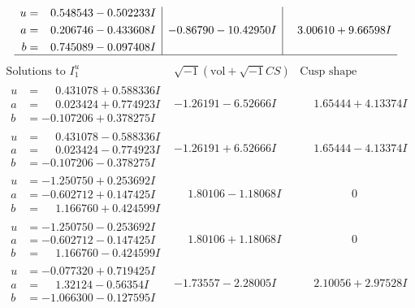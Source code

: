 \documentclass[1p]{elsarticle_modified}
\theoremstyle{definition}
\newcommand{\I}{\sqrt{-1}}
\begin{document}
$$\begin{array}{c|c|c}
\begin{aligned}
u &= \phantom{-}0.548543 - 0.502233 I \\
a &= \phantom{-}0.206746 - 0.433608 I \\
b &= \phantom{-}0.745089 - 0.097408 I\end{aligned}
 & -0.86790 - 10.42950 I & \phantom{-}3.00610 + 9.66598 I\\
 \hline 
 \end{array}$$\newpage$$\begin{array}{c|c|c}  
\text{Solutions to }I^u_{1}& \I (\text{vol} + \sqrt{-1}CS) & \text{Cusp shape}\\
 \hline 
\begin{aligned}
u &= \phantom{-}0.431078 + 0.588336 I \\
a &= \phantom{-}0.023424 + 0.774923 I \\
b &= -0.107206 + 0.378275 I\end{aligned}
 & -1.26191 - 6.52666 I & \phantom{-}1.65444 + 4.13374 I \\ \hline\begin{aligned}
u &= \phantom{-}0.431078 - 0.588336 I \\
a &= \phantom{-}0.023424 - 0.774923 I \\
b &= -0.107206 - 0.378275 I\end{aligned}
 & -1.26191 + 6.52666 I & \phantom{-}1.65444 - 4.13374 I \\ \hline\begin{aligned}
u &= -1.250750 + 0.253692 I \\
a &= -0.602712 + 0.147425 I \\
b &= \phantom{-}1.166760 + 0.424599 I\end{aligned}
 & \phantom{-}1.80106 - 1.18068 I & \phantom{-0.000000 } 0 \\ \hline\begin{aligned}
u &= -1.250750 - 0.253692 I \\
a &= -0.602712 - 0.147425 I \\
b &= \phantom{-}1.166760 - 0.424599 I\end{aligned}
 & \phantom{-}1.80106 + 1.18068 I & \phantom{-0.000000 } 0 \\ \hline\begin{aligned}
u &= -0.077320 + 0.719425 I \\
a &= \phantom{-}1.32124 - 0.56354 I \\
b &= -1.066300 - 0.127595 I\end{aligned}
 & -1.73557 - 2.28005 I & \phantom{-}2.10056 + 2.97528 I \\ \hline\begin{aligned}

\end{aligned}
\end{array}$$
\end{document}
